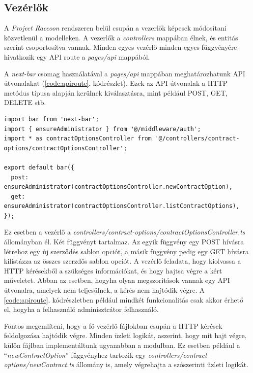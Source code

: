 \subsection{Vezérlők}

A \textit{Project Raccoon} rendszeren belül csupán a vezerlők képesek módosítani közvetlenül a modelleken. A vezerlők a \textit{controllers} mappában élnek, és entitás szerint csoportosítva vannak. Minden egyes vezérlő minden egyes függvényére hivatkozik egy API route a \textit{pages/api} mappából.

A \textit{next-bar} csomag használatával a \textit{pages/api} mappában meghatározhatunk API útvonalakat (\ref{code:apiroute}. kódrészlet). Ezek az API útvonalak a HTTP metódus típusa alapján kerülnek kiválasztásra, mint például POST, GET, DELETE stb.

\pagebreak

\begin{lstlisting}[caption={ Példa implementáció egy API útvonalra, mely egy vezérlőre csatlakozik }, captionpos=b, language = TS, label={code:apiroute}]
import bar from 'next-bar';
import { ensureAdministrator } from '@/middleware/auth';
import * as contractOptionsController from '@/controllers/contract-options/contractOptionsController';

export default bar({
  post: ensureAdministrator(contractOptionsController.newContractOption),
  get: ensureAdministrator(contractOptionsController.listContractOptions),
});
\end{lstlisting}

Ez esetben a vezérlő a \textit{controllers/contract-options/contractOptionsController.ts} állományban él. Két függvényt tartalmaz. Az egyik függvény egy POST hívásra létrehoz egy új szerződés sablon opciót, a másik függvény pedig egy GET hívásra kilistázza az összes szerzdős sablon opciót. A vezérlő feladata, hogy kiolvassa a HTTP kérésekből a szükséges információkat, és hogy hajtsa végre a kért műveletet. Abban az esetben, hogyha olyan megszorítások vannak egy API útvonalra, amelyek nem teljesülnek, a kérés nem hajtódik végre. A \ref{code:apiroute}. kódrészletben például mindkét funkcionalitás csak akkor érhető el, hogyha a felhasználó adminisztrátor felhasználó.

Fontos megemlíteni, hogy a fő vezérlő fájlokban csupán a HTTP kérések feldolgozása hajtódik végre. Minden üzleti logikát, aszerint, hogy mit hajt végre, külön fájlban implementáltunk ugyanabban a modulban. Ez esetben például a ``\textit{newContractOption}'' függvényhez tartozik egy \textit{controllers/contract-options/newContract.ts} állomány is, amely végrehajta a szószerinti üzleti logikát.

